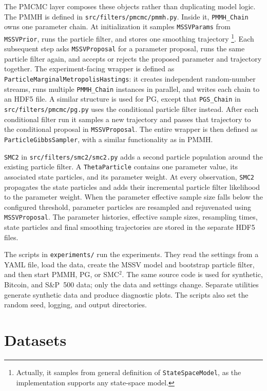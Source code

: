 The PMCMC layer composes these objects rather than duplicating model logic. The PMMH is defined in \texttt{src/filters/pmcmc/pmmh.py}.
Inside it, \texttt{PMMH\_Chain} owns one parameter chain.  At
initialization it samples \texttt{MSSVParams} from \texttt{MSSVPrior}, runs the
particle filter, and stores one smoothing trajectory \footnote{Actually, it samples from general definition of \texttt{StateSpaceModel}, as the implementation supports any state-space model.}.  Each subsequent step
asks \texttt{MSSVProposal} for a parameter proposal, runs the same particle
filter again, and accepts or rejects the proposed parameter and trajectory
together. The experiment-facing
wrapper is defined as \texttt{ParticleMarginalMetropolisHastings}: it creates independent random-number streams, runs multiple
\texttt{PMMH\_Chain} instances in parallel, and writes each chain to an HDF5
file.  A similar structure is used for PG, except that \texttt{PGS\_Chain} in \texttt{src/filters/pmcmc/pg.py} uses the conditional particle
filter instead.  After each conditional filter run it samples a new
trajectory and passes that trajectory to the conditional proposal in
\texttt{MSSVProposal}. The entire wrapper is then defined as \texttt{ParticleGibbsSampler}, with a similar functionality as in PMMH.

\texttt{SMC2} in \texttt{src/filters/smc2/smc2.py} adds a second particle
population around the existing particle filter.  A \texttt{ThetaParticle}
contains one parameter value, its associated state particles, and its
parameter weight.  At every observation, \texttt{SMC2} propagates the state
particles and adds their incremental particle filter likelihood to the
parameter weight.  When the parameter effective sample size falls below the
configured threshold, parameter particles are resampled and rejuvenated using
\texttt{MSSVProposal}. The parameter histories, effective sample sizes, resampling times, state particles and final smoothing trajectories are stored in the separate HDF5 files.

The scripts in \texttt{experiments/} run the experiments.  They read the
settings from a YAML file, load the data, create the MSSV model and bootstrap
particle filter, and then start PMMH, PG, or SMC$^2$.  The same source code is
used for synthetic, Bitcoin, and S\&P~500 data; only the data and settings
change.  Separate utilities generate synthetic data and produce diagnostic
plots.  The scripts also set the random seed, logging, and output directories.

\section{Datasets}


